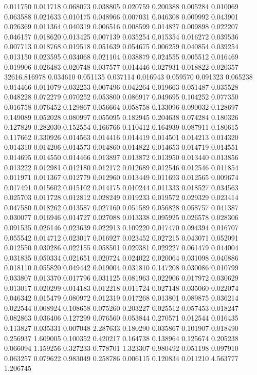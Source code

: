 0.011750
0.011718
0.068073
0.038805
0.020759
0.200388
0.005284
0.010069
0.063588
0.021633
0.010175
0.048966
0.007031
0.046308
0.009992
0.043901
0.026369
0.011364
0.040319
0.006516
0.008599
0.014827
0.009898
0.022207
0.046157
0.018620
0.013425
0.007139
0.035254
0.015354
0.016272
0.039536
0.007713
0.018768
0.019518
0.051639
0.054675
0.006259
0.040854
0.039254
0.013150
0.023595
0.034068
0.021104
0.038879
0.024555
0.005512
0.016469
0.019906
0.026483
0.020748
0.037577
0.014446
0.027931
0.018822
0.020357
32616.816978
0.034610
0.051135
0.037114
0.016943
0.059570
0.091323
0.065238
0.014466
0.011079
0.032253
0.007496
0.042264
0.019663
0.051487
0.035528
0.048228
0.072279
0.070252
0.053800
0.086917
0.049695
0.104252
0.077350
0.016758
0.076452
0.129867
0.056664
0.058758
0.133096
0.090032
0.128697
0.149089
0.052028
0.080997
0.055095
0.182945
0.204638
0.074284
0.180326
0.127829
0.282030
0.152554
0.166766
0.110412
0.164939
0.087911
0.180615
0.117662
0.330926
0.014563
0.014416
0.014419
0.014501
0.014213
0.014320
0.014310
0.014206
0.014573
0.014860
0.014822
0.014653
0.014719
0.014551
0.014695
0.014550
0.014466
0.013897
0.013872
0.013950
0.013440
0.013856
0.013222
0.012981
0.012180
0.012172
0.012689
0.012546
0.012546
0.011854
0.011971
0.011367
0.012779
0.012960
0.013449
0.011693
0.012565
0.009674
0.017491
0.015602
0.015102
0.014175
0.010244
0.011333
0.018527
0.034563
0.025703
0.011728
0.012812
0.028249
0.019233
0.019572
0.029329
0.023414
0.047580
0.018262
0.013587
0.027160
0.051589
0.056828
0.058757
0.041387
0.030077
0.016946
0.014727
0.027088
0.013338
0.095925
0.026578
0.028306
0.091535
0.026146
0.023639
0.022913
0.109220
0.017470
0.094394
0.016707
0.055542
0.014712
0.023017
0.016927
0.023452
0.027215
0.043071
0.052091
0.012550
0.030286
0.022155
0.058501
0.029381
0.029227
0.061479
0.044004
0.031835
0.050334
0.021651
0.020724
0.024022
0.020064
0.031098
0.040886
0.018110
0.055820
0.049442
0.019004
0.031810
0.147208
0.030086
0.010799
0.033807
0.013370
0.017796
0.031125
0.081963
0.022906
0.017972
0.030629
0.013017
0.020299
0.014183
0.012218
0.011724
0.027148
0.035060
0.022074
0.046342
0.015479
0.080972
0.012319
0.017268
0.013801
0.089875
0.036214
0.022544
0.008924
0.108658
0.075260
0.203227
0.025512
0.057453
0.018247
0.082863
0.036406
0.127299
0.076560
0.053844
0.270571
0.012544
0.016435
0.113827
0.035331
0.007048
2.287633
0.180290
0.035867
0.101907
0.018490
0.256937
1.609005
0.100352
0.420217
0.164738
0.138964
0.125674
0.205238
0.066094
1.159256
0.327233
0.778701
1.323307
0.980492
0.051198
0.097910
0.063257
0.079622
0.983049
0.258786
0.006115
0.120834
0.011210
4.563777
1.206745
